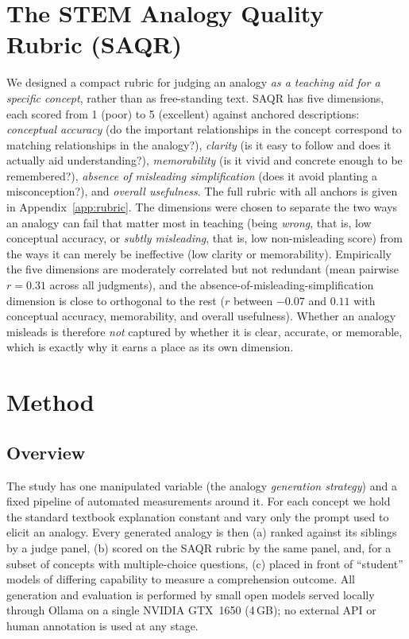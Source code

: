 \documentclass[11pt]{article}
\begin{document}
\section{The STEM Analogy Quality Rubric (SAQR)}
\label{sec:rubric}
We designed a compact rubric for judging an analogy \emph{as a teaching aid for a
specific concept}, rather than as free-standing text. SAQR has five dimensions,
each scored from 1 (poor) to 5 (excellent) against anchored descriptions:
\emph{conceptual accuracy} (do the important relationships in the concept
correspond to matching relationships in the analogy?), \emph{clarity} (is it
easy to follow and does it actually aid understanding?), \emph{memorability} (is
it vivid and concrete enough to be remembered?), \emph{absence of misleading
simplification} (does it avoid planting a misconception?), and \emph{overall
usefulness}. The full rubric with all anchors is given in
Appendix~\ref{app:rubric}. The dimensions were chosen to separate the two ways an
analogy can fail that matter most in teaching (being \emph{wrong}, that is, low
conceptual accuracy, or \emph{subtly misleading}, that is, low non-misleading
score) from the ways it can merely be ineffective (low clarity or
memorability). Empirically the five dimensions are moderately correlated but not
redundant (mean pairwise $r = 0.31$ across all judgments), and the
absence-of-misleading-simplification dimension is close to orthogonal to the rest
($r$ between $-0.07$ and $0.11$ with conceptual accuracy, memorability, and overall
usefulness). Whether an analogy misleads is therefore \emph{not} captured by whether
it is clear, accurate, or memorable, which is exactly why it earns a place as its own
dimension.

\section{Method}
\label{sec:method}

\subsection{Overview}
The study has one manipulated variable (the analogy \emph{generation
strategy}) and a fixed pipeline of automated measurements around it. For each
concept we hold the standard textbook explanation constant and vary only the
prompt used to elicit an analogy. Every generated analogy is then (a) ranked
against its siblings by a judge panel, (b) scored on the SAQR rubric by the same
panel, and, for a subset of concepts with multiple-choice questions, (c) placed
in front of ``student'' models of differing capability to measure a
comprehension outcome. All generation and evaluation is performed by small open
models served locally through Ollama on a single NVIDIA GTX~1650 (4\,GB);
no external API or human annotation is used at any stage.
\end{document}
